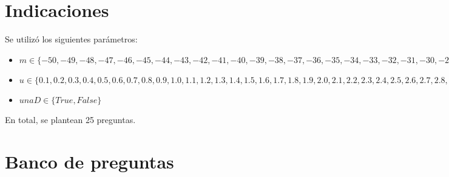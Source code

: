 \documentclass[a4,11pt]{aleph-notas}
\begin{document}
\encabezado

\section{Indicaciones}



Se utilizó los siguientes parámetros:
\begin{itemize}
	\item $m \in \{-50, -49, -48, -47, -46, -45, -44, -43, -42, -41, -40, -39, -38, -37, -36, -35, -34, -33, -32, -31, -30, -29, -28, -27, -26, -25, -24, -23, -22, -21, -20, -19, -18, -17, -16, -15, -14, -13, -12, -11, -10, -9, -8, -7, -6, -5, -4, -3, -2, -1, 0, 1, 2, 3, 4, 5, 6, 7, 8, 9, 10, 11, 12, 13, 14, 15, 16, 17, 18, 19, 20, 21, 22, 23, 24, 25, 26, 27, 28, 29, 30, 31, 32, 33, 34, 35, 36, 37, 38, 39, 40, 41, 42, 43, 44, 45, 46, 47, 48, 49, 50\}$
	\item $u \in \{0.1, 0.2, 0.3, 0.4, 0.5, 0.6, 0.7, 0.8, 0.9, 1.0, 1.1, 1.2, 1.3, 1.4, 1.5, 1.6, 1.7, 1.8, 1.9, 2.0, 2.1, 2.2, 2.3, 2.4, 2.5, 2.6, 2.7, 2.8, 2.9, 3.0, 3.1, 3.2, 3.3, 3.4, 3.5, 3.6, 3.7, 3.8, 3.9, 4.0, 4.1, 4.2, 4.3, 4.4, 4.5, 4.6, 4.7, 4.8, 4.9\}$
	\item $unaD \in \{True, False\}$

\end{itemize}
En total, se plantean 25 preguntas.


\section{Banco de preguntas}
\end{document}
